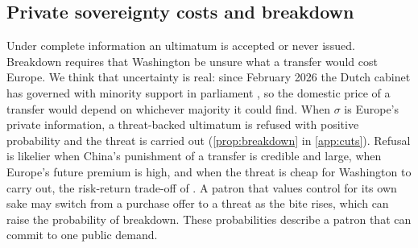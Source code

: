 \subsection{Private sovereignty costs and breakdown}\label{sec:breakdown}

Under complete information an ultimatum is accepted or never issued. Breakdown requires that Washington be unsure what a transfer would cost Europe. We think that uncertainty is real: since February 2026 the Dutch cabinet has governed with minority support in parliament \citep{nltimes2026coalition, omroepbrabant2026kabinet}, so the domestic price of a transfer would depend on whichever majority it could find. When $\sigma$ is Europe's private information, a threat-backed ultimatum is refused with positive probability and the threat is carried out (\cref{prop:breakdown} in \cref{app:cuts}). Refusal is likelier when China's punishment of a transfer is credible and large, when Europe's future premium is high, and when the threat is cheap for Washington to carry out, the risk-return trade-off of \citet{fearon1995rationalist}. A patron that values control for its own sake may switch from a purchase offer to a threat as the bite rises, which can raise the probability of breakdown. These probabilities describe a patron that can commit to one public demand.
